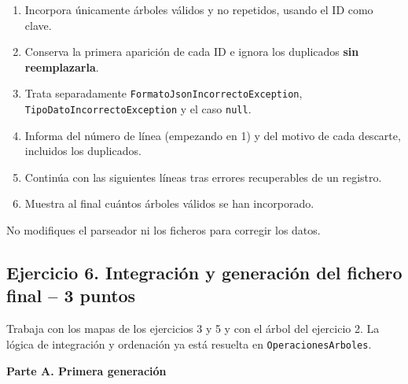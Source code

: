 \documentclass[a4paper,12pt]{article}
\begin{document}
\begin{enumerate}
\item Incorpora únicamente árboles válidos y no repetidos, usando el ID como clave.
\item Conserva la primera aparición de cada ID e ignora los duplicados \textbf{sin reemplazarla}.
\item Trata separadamente \texttt{F\allowbreak{}o\allowbreak{}r\allowbreak{}m\allowbreak{}a\allowbreak{}t\allowbreak{}o\allowbreak{}J\allowbreak{}s\allowbreak{}o\allowbreak{}n\allowbreak{}I\allowbreak{}n\allowbreak{}c\allowbreak{}o\allowbreak{}r\allowbreak{}r\allowbreak{}e\allowbreak{}c\allowbreak{}t\allowbreak{}o\allowbreak{}E\allowbreak{}x\allowbreak{}c\allowbreak{}e\allowbreak{}p\allowbreak{}t\allowbreak{}i\allowbreak{}o\allowbreak{}n}, \texttt{T\allowbreak{}i\allowbreak{}p\allowbreak{}o\allowbreak{}D\allowbreak{}a\allowbreak{}t\allowbreak{}o\allowbreak{}I\allowbreak{}n\allowbreak{}c\allowbreak{}o\allowbreak{}r\allowbreak{}r\allowbreak{}e\allowbreak{}c\allowbreak{}t\allowbreak{}o\allowbreak{}E\allowbreak{}x\allowbreak{}c\allowbreak{}e\allowbreak{}p\allowbreak{}t\allowbreak{}i\allowbreak{}o\allowbreak{}n} y el caso \texttt{null}.
\item Informa del número de línea (empezando en 1) y del motivo de cada descarte, incluidos los duplicados.
\item Continúa con las siguientes líneas tras errores recuperables de un registro.
\item Muestra al final cuántos árboles válidos se han incorporado.
\end{enumerate}

No modifiques el parseador ni los ficheros para corregir los datos.\par

\subsection*{\color{secondary}Ejercicio 6. Integración y generación del fichero final  --  3 puntos}

Trabaja con los mapas de los ejercicios 3 y 5 y con el árbol del ejercicio 2. La lógica de integración y ordenación ya está resuelta en \texttt{OperacionesArboles}.\par

\textbf{Parte A. Primera generación}\par
\end{document}
